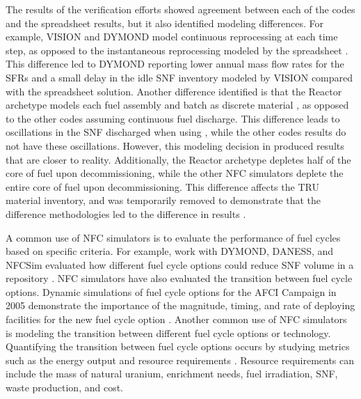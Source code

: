 The results of the verification efforts showed agreement between each 
of the codes and the spreadsheet results, but it also identified modeling 
differences. For example, \gls{VISION} and \gls{DYMOND} model continuous 
reprocessing at each time step, as opposed to the instantaneous 
reprocessing modeled by the spreadsheet \cite{feng_standardized_2016}. 
This difference led to \gls{DYMOND} reporting lower annual mass flow 
rates for the \glspl{SFR} and a small delay in the idle \gls{SNF} 
inventory modeled by \gls{VISION} compared with the spreadsheet 
solution. 
Another difference identified is that the \Cycamore Reactor 
archetype models each fuel assembly and batch as discrete material 
\cite{bae_standardized_2019}, as 
opposed to the other codes assuming continuous fuel discharge. 
This difference leads to oscillations in the \gls{SNF} discharged 
when using \Cyclus, while the other codes results do not have these 
oscillations.
However, this modeling decision in \Cyclus produced results that 
are closer to reality. 
Additionally, the \Cycamore Reactor archetype depletes half of the 
core of fuel upon decommissioning, while the other \gls{NFC} simulators 
deplete the entire core of fuel upon decommissioning. This 
difference affects the \gls{TRU} material inventory, and was 
temporarily removed to demonstrate that the difference 
methodologies led to the difference in results \cite{bae_standardized_2019}.

A common use of \gls{NFC} simulators is to evaluate the performance 
of fuel cycles based on specific criteria. 
For example, work with \gls{DYMOND}, \gls{DANESS}, 
and \gls{NFCSim} evaluated how different fuel cycle options 
could reduce \gls{SNF} volume in a repository \cite{yacout_dynamic_2004}. 
\gls{NFC} simulators have also evaluated the transition between fuel cycle 
options. Dynamic simulations of fuel cycle options for the \gls{AFCI}
Campaign in 2005 demonstrate the importance of the magnitude, timing, 
and rate of deploying facilities for the new fuel cycle option 
\cite{piet_assessment_2011}.
Another common use of \gls{NFC} simulators is modeling the transition 
between 
different fuel cycle options or technology. Quantifying the transition 
between fuel cycle options occurs by studying metrics such as the 
energy output and resource requirements \cite{del_cul_advanced_2010}. 
Resource requirements can include the mass of natural uranium, enrichment 
needs, fuel irradiation, \gls{SNF}, waste production, and cost. 

